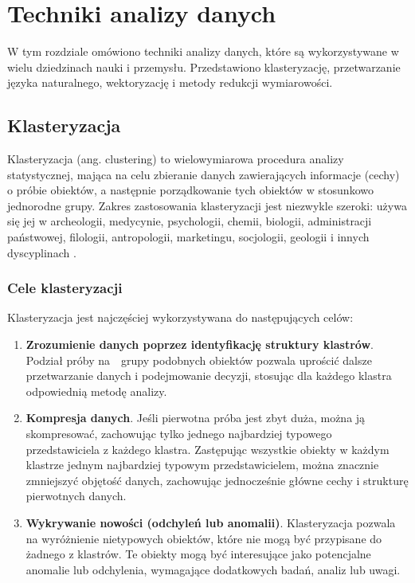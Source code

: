 \chapter{Techniki analizy danych}

W tym rozdziale omówiono techniki analizy danych, które są wykorzystywane w wielu dziedzinach nauki i przemysłu.  Przedstawiono klasteryzację, przetwarzanie języka naturalnego, wektoryzację i metody redukcji wymiarowości.
	

\section{Klasteryzacja}

	Klasteryzacja (ang. clustering) to wielowymiarowa procedura analizy statystycznej, mająca na celu zbieranie danych zawierających informacje (cechy) o próbie obiektów, a następnie porządkowanie tych obiektów w stosunkowo jednorodne grupy. Zakres zastosowania klasteryzacji jest niezwykle szeroki: używa się jej w archeologii, medycynie, psychologii, chemii, biologii, administracji państwowej, filologii, antropologii, marketingu, socjologii, geologii i innych dyscyplinach \cite{Clustering}. 
	
	\subsection{Cele klasteryzacji}
		Klasteryzacja jest najczęściej wykorzystywana do następujących celów:
		\begin{enumerate}
			\item \textbf{Zrozumienie danych poprzez identyfikację struktury klastrów}. Podział próby na~~grupy podobnych obiektów pozwala uprościć dalsze przetwarzanie danych i podejmowanie decyzji, stosując dla każdego klastra odpowiednią metodę analizy.
			\item \textbf{Kompresja danych}. Jeśli pierwotna próba jest zbyt duża, można ją skompresować, zachowując tylko jednego najbardziej typowego przedstawiciela z każdego klastra. Zastępując wszystkie obiekty w każdym klastrze jednym najbardziej typowym przedstawicielem, można znacznie zmniejszyć objętość danych, zachowując jednocześnie główne cechy i strukturę pierwotnych danych.
			\item \textbf{Wykrywanie nowości (odchyleń lub anomalii)}. Klasteryzacja pozwala na wyróżnienie nietypowych obiektów, które nie mogą być przypisane do żadnego z klastrów. Te obiekty mogą być interesujące jako potencjalne anomalie lub odchylenia, wymagające dodatkowych badań, analiz lub uwagi.
		\end{enumerate}
	
